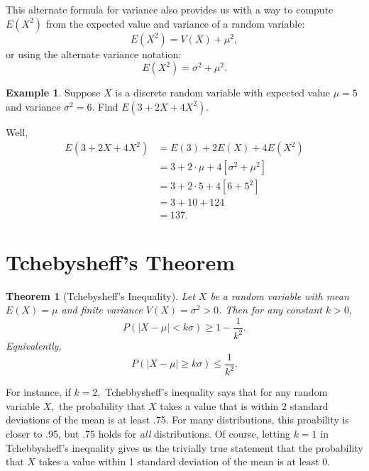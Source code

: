 \documentclass[
]{book}
\newtheorem{theorem}{Theorem}[chapter]
\theoremstyle{definition}
\theoremstyle{definition}
\newtheorem{example}{Example}[chapter]
\theoremstyle{definition}
\theoremstyle{definition}
\theoremstyle{remark}
\begin{document}
This alternate formula for variance also provides us with a way to compute \(E(X^2)\) from the expected value and variance of a random variable: \[E(X^2) = V(X) + \mu^2,\] or using the alternate variance notation:
\[E(X^2) = \sigma^2 + \mu^2.\]

\begin{example}
Suppose \(X\) is a discrete random variable with expected value \(\mu = 5\) and variance \(\sigma^2 = 6\).
Find \(E(3+2X+4X^2)\).

Well, \begin{align*}
E(3 + 2X + 4X^2) &= E(3) + 2E(X) + 4E(X^2) \\
                 &= 3 + 2\cdot \mu + 4[\sigma^2+\mu^2] \\
                 &= 3 + 2 \cdot 5 + 4[6 + 5^2] \\
                 &= 3 + 10 + 124 \\
                 &= 137.
\end{align*}
\end{example}

\section{Tchebysheff's Theorem}\label{tchebysheffs-theorem}

\begin{theorem}[Tchebysheff's Inequality]
\protect\hypertarget{thm:tcheby}{}\label{thm:tcheby}Let \(X\) be a random variable with mean \(E(X) = \mu\) and finite variance \(V(X) = \sigma^2 > 0\). Then for any constant \(k > 0,\)
\[P(|X - \mu| < k\sigma ) \geq 1 - \frac{1}{k^2}.\]
Equivalently, \[P(|X - \mu| \geq k\sigma) \leq \frac{1}{k^2}.\]
\end{theorem}

For instance, if \(k = 2,\) Tchebbysheff's inequality says that for any random variable \(X,\) the probability that \(X\) takes a value that is within 2 standard deviations of the mean is at least .75. For many distributions, this proability is closer to .95, but .75 holds for \emph{all} distributions.
Of course, letting \(k = 1\) in Tchebbysheff's inequality gives us the trivially true statement that the probability that \(X\) takes a value within 1 standard deviation of the mean is at least 0.
\end{document}
